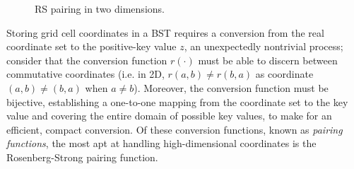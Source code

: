 \documentclass[paper,11pt]{AAS}
\begin{document}
\begin{figure}
\begin{minipage}{0.375\textwidth}
        \caption{RS pairing in two dimensions.}
        \label{fig:RS_pairing}
    \end{minipage}
\end{figure}

Storing grid cell coordinates in a BST requires a conversion from the real coordinate set to the positive-key value $z$, an unexpectedly nontrivial process; consider that the conversion function $r(\cdot)$ must be able to discern between commutative coordinates (i.e. in 2D, $r(a,b)\neq r(b,a)$ as coordinate $(a,b) \neq (b,a)$ when $a\neq b$). Moreover, the conversion function must be bijective, establishing a one-to-one mapping from the coordinate set to the key value and covering the entire domain of possible key values, to make for an efficient, compact conversion. Of these conversion functions, known as \textit{pairing functions}, the most apt at handling high-dimensional coordinates is the Rosenberg-Strong pairing function. 
\end{document}
